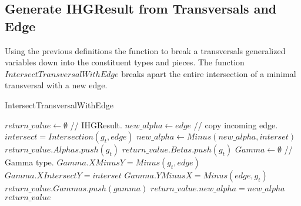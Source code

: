\newpage
\subsection{Generate IHGResult from Transversals and Edge}
Using the previous definitions the function to break a transversals generalized variables down into the constituent types and pieces. The function $IntersectTransversalWithEdge$ breaks apart the entire intersection of a minimal transversal with a new edge. 



\begin{algorithm}
	\caption{IntersectTransversalWithEdge}\label{IntersectTransversalWithEdge}
	\begin{algorithmic}[1]
		\State $return\_value \gets \emptyset$ // IHGResult.
		\State $new\_alpha \gets edge$ // copy incoming edge.
		\State $intersect = Intersection(g_t,edge)$
		\State $new\_alpha \gets Minus(new\_alpha,interset)$
		\State $return\_value.Alphas.push(g_t)$
		\Else
		\State $return\_value.Betas.push(g_t)$		
		\Else
		\State $Gamma \gets \emptyset$ // Gamma type.
		\State $Gamma.XMinusY = Minus(g_t,edge)$
		\State $Gamma.XIntersectY = interset$
		\State $Gamma.YMinusX = Minus(edge,g_t)$
		\State $return\_value.Gammas.push(gamma)$
		\EndIf
		\EndIf
		\EndFor
		\State $return\_value.new\_alpha = new\_alpha$
		\State \Return $return\_value$
		\EndFunction
	\end{algorithmic}
\end{algorithm}

